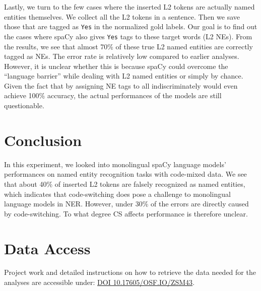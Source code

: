 \documentclass[11pt]{article}
\begin{document}
Lastly, we turn to the few cases where the inserted L2 tokens are actually named entities themselves. We collect all the L2 tokens in a sentence. Then we save those that are tagged as \texttt{Yes} in the normalized gold labels. Our goal is to find out the cases where spaCy also gives \texttt{Yes} tags to these target words (L2 NEs). From the results, we see that almost 70\% of these true L2 named entities are correctly tagged as NEs. The error rate is relatively low compared to earlier analyses. However, it is unclear whether this is because spaCy could overcome the ``language barrier'' while dealing with L2 named entities or simply by chance. Given the fact that by assigning NE tags to all indiscriminately would even achieve 100\% accuracy, the actual performances of the models are still questionable.


\section{Conclusion}

In this experiment, we looked into monolingual spaCy language models' performances on named entity recognition tasks with code-mixed data. We see that about 40\% of inserted L2 tokens are falsely recognized as named entities, which indicates that code-switching does pose a challenge to monolingual language models in NER. However, under 30\% of the errors are directly caused by code-switching. To what degree CS affects performance is therefore unclear.








\appendix

\section{Data Access}

Project work and detailed instructions on how to retrieve the data needed for the analyses are accessible under: \href{https://osf.io/zsm43/}{DOI 10.17605/OSF.IO/ZSM43}.
\end{document}
